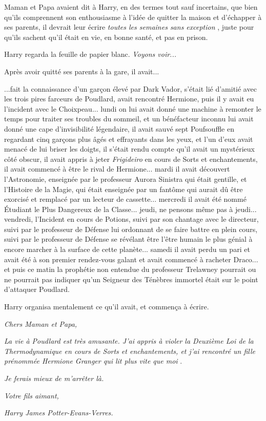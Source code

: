 Maman et Papa avaient dit à Harry, en des termes tout sauf incertains, que bien qu'ils comprennent son enthousiasme à l'idée de quitter la maison et d'échapper à ses parents, il devrait leur écrire \emph{toutes les semaines sans exception} , juste pour qu'ils sachent qu'il était en vie, en bonne santé, et pas en prison.

Harry regarda la feuille de papier blanc. \emph{Voyons voir...} 

Après avoir quitté ses parents à la gare, il avait...

...fait la connaissance d'un garçon élevé par Dark Vador, s'était lié d'amitié avec les trois pires farceurs de Poudlard, avait rencontré Hermione, puis il y avait eu l'incident avec le Choixpeau... lundi on lui avait donné une machine à remonter le temps pour traiter ses troubles du sommeil, et un bénéfacteur inconnu lui avait donné une cape d'invisibilité légendaire, il avait sauvé sept Poufsouffle en regardant cinq garçons plus âgés et effrayants dans les yeux, et l'un d'eux avait menacé de lui briser les doigts, il s'était rendu compte qu'il avait un mystérieux côté obscur, il avait appris à jeter \emph{Frigideiro}  en cours de Sorts et enchantements, il avait commencé à être le rival de Hermione... mardi il avait découvert l'Astronomie, enseignée par le professeur Aurora Sinistra qui était gentille, et l'Histoire de la Magie, qui était enseignée par un fantôme qui aurait dû être exorcisé et remplacé par un lecteur de cassette... mercredi il avait été nommé Étudiant le Plus Dangereux de la Classe... jeudi, ne pensons même pas à jeudi... vendredi, l'Incident en cours de Potions, suivi par son chantage avec le directeur, suivi par le professeur de Défense lui ordonnant de se faire battre en plein cours, suivi par le professeur de Défense se révélant être l'être humain le plus génial à encore marcher à la surface de cette planète... samedi il avait perdu un pari et avait été à son premier rendez-vous galant et avait commencé à racheter Draco... et puis ce matin la prophétie non entendue du professeur Trelawney pourrait ou ne pourrait pas indiquer qu'un Seigneur des Ténèbres immortel était sur le point d'attaquer Poudlard.

Harry organisa mentalement ce qu'il avait, et commença à écrire.

\emph{Chers Maman et Papa,} 

\emph{La vie à Poudlard est très amusante. J'ai appris à violer la Deuxième Loi de la Thermodynamique en cours de Sorts et enchantements, et j'ai rencontré un fille prénommée Hermione Granger qui lit plus vite que moi} .

\emph{Je ferais mieux de m'arrêter là.} 

\emph{Votre fils aimant,} 

\emph{Harry James Potter-Evans-Verres.} 

